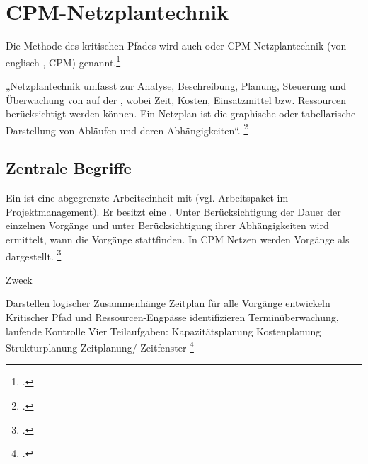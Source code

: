 \documentclass{lehramt-informatik-haupt}
\begin{document}

\chapter{CPM-Netzplantechnik}

\begin{liQuellen}
\item \cite{wiki:netzplantechnik}
\item \cite{wiki:methode-kritischer-pfad}
\end{liQuellen}

\noindent
Die Methode des kritischen Pfades wird auch
 oder CPM-Netzplantechnik (von
englisch , CPM)
genannt.\footcite{wiki:methode-kritischer-pfad}

„Netzplantechnik umfasst  zur Analyse,
Beschreibung, Planung, Steuerung und Überwachung von 
auf der , wobei Zeit, Kosten,
Einsatzmittel bzw. Ressourcen berücksichtigt werden können. Ein Netzplan
ist die graphische oder tabellarische Darstellung von Abläufen und deren
Abhängigkeiten“.
\footcite[Seite 14]{sosy:fs:3}

%

\section{Zentrale Begriffe}

Ein  ist eine abgegrenzte Arbeitseinheit mit
 (vgl. Arbeitspaket im Projektmanagement).
Er besitzt eine .
%
Unter Berücksichtigung der Dauer der einzelnen Vorgänge und unter
Berücksichtigung ihrer Abhängigkeiten wird ermittelt, wann die Vorgänge
stattfinden.
%
In CPM Netzen werden Vorgänge als 
dargestellt.
\footcite[Seite 15]{sosy:fs:3}

Zweck

Darstellen logischer Zusammenhänge
Zeitplan für alle Vorgänge entwickeln
Kritischer Pfad und Ressourcen-Engpässe identifizieren
Terminüberwachung, laufende Kontrolle
Vier Teilaufgaben:
Kapazitätsplanung
Kostenplanung
Strukturplanung
Zeitplanung/ Zeitfenster
\footcite[Seite 22]{sosy:fs:3}
\end{document}
